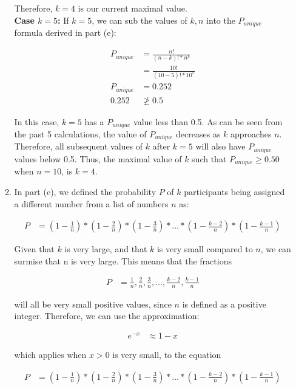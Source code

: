 \documentclass[11pt]{article}
\theoremstyle{definition}
\begin{document}
\begin{enumerate}
\begin{enumerate}
Therefore, $k = 4$ is our current maximal value.\\

\textbf{Case $k = 5$:} If $k = 5$, we can sub the values of $k, n$ into the $P_{unique}$ formula derived in part (e):

\begin{align*}
P_{unique} &= \frac{n!}{(n - k)! * n^k}\\
&= \frac{10!}{(10 - 5)! * 10^5}\\
P_{unique} &= 0.252\\
0.252 &\ngeq 0.5
\end{align*}

In this case, $k = 5$ has a $P_{unique}$ value less than 0.5. As can be seen from the past 5 calculations, the value of $P_{unique}$ decreases as $k$ approaches $n$. Therefore, all subsequent values of
$k$ after $k = 5$ will also have $P_{unique}$ values below 0.5. Thus, the maximal value of $k$ such that $P_{unique} \geq 0.50$ when $n = 10$, is $k = 4$.

\item In part (e), we defined the probability $P$ of $k$ participants being assigned a different number from a list of numbers $n$ as:

\begin{align*}
P &= (1 - \frac{1}{n}) * (1 - \frac{2}{n}) * (1 - \frac{3}{n}) * \ldots * (1 - \frac{k - 2}{n}) * (1 - \frac{k - 1}{n})
\end{align*}

Given that $k$ is very large, and that $k$ is very small compared to $n$, we can surmise that n is very large. This means that the fractions 

\begin{align*}
P &= \frac{1}{n}, \frac{2}{n}, \frac{3}{n}, \ldots, \frac{k - 2}{n}, \frac{k - 1}{n}
\end{align*}

will all be very small positive values, since $n$ is defined as a positive integer. Therefore, we can use the approximation:

\begin{align*}
e^{-x} &\approx 1 - x
\end{align*}

which applies when $x > 0$ is very small, to the equation

\begin{align*}
P &= (1 - \frac{1}{n}) * (1 - \frac{2}{n}) * (1 - \frac{3}{n}) * \ldots * (1 - \frac{k - 2}{n}) * (1 - \frac{k - 1}{n})
\end{align*}


\end{enumerate}
\end{enumerate}
\end{document}
